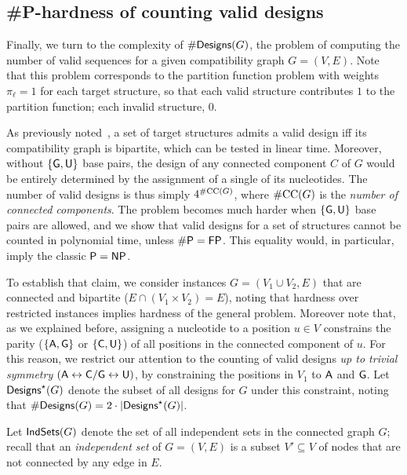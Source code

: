 \documentclass[twocolumn]{bmcart}%
\newcommand{\real}{\mathbb{R}}
\newcommand{\Def}[1]{\emph{#1}}
\newcommand{\Design}[1]{{\sf Designs}^{\star}(#1)}
\newcommand{\NumDesign}{\ensuremath{\#}{\sf Designs}\xspace}
\newcommand{\IS}[1]{{\sf IndSets}(#1)}
\newcommand{\Nuc}[1]{{\sf #1}}
\newcommand{\Ab}{\Nuc{A}}
\newcommand{\Cb}{\Nuc{C}}
\newcommand{\Gb}{\Nuc{G}}
\newcommand{\Ub}{\Nuc{U}}
\newcommand{\citep}[1]{\cite{#1}}
\begin{document}
\subsection*{\#{\sf P}-hardness of counting valid designs}\label{sec:counting}
Finally, we turn to the complexity of $\NumDesign(G)$, the problem of
computing the number of valid sequences for a given compatibility
graph $G=(V,E)$. Note that this problem corresponds to the partition
function problem with weights $\pi_\ell=1$ for each target structure, so that each valid structure contributes $1$ to the partition
function; each invalid structure, 0.

As previously noted~\citep{Flamm2001}, a set of target
structures admits a valid design iff its compatibility graph is
bipartite, which can be tested in linear time.  Moreover, without
$\{\Gb, \Ub\}$ base pairs, the design of any connected component $C$
of $G$ would be entirely determined by the assignment of a single of
its nucleotides. The number of valid designs is thus simply
$4^{\#{\rm CC}(G)}$, where $\#{\rm CC}(G)$ is the \Def{number of
  connected components}.
The problem becomes much harder when $\{\Gb, \Ub\}$ base pairs are allowed, and we show that valid designs for a set of structures cannot be counted in polynomial time, unless ${\sf\# P}={\sf FP}$. This equality would, in particular, imply the classic ${\sf P}={\sf NP}$.

To establish that claim, we consider instances $G=(V_1\cup V_2, E)$ that are connected and bipartite ($E \cap (V_1\times V_2) = E$), noting that hardness over restricted instances implies hardness of the general problem. Moreover note that, as we explained before, assigning a nucleotide to a position $u\in V$ constrains the parity ($\{\Ab,\Gb\}$ or $\{\Cb,\Ub\}$) of all positions in the connected component of $u$. For this reason, we restrict our attention to the counting of valid designs \emph{up to trivial  symmetry} $(\Ab\leftrightarrow \Cb/\Gb\leftrightarrow \Ub)$, by constraining the positions in $V_{1}$ to $\Ab$ and $\Gb$. Let $\Design{G}$ denote the subset of all designs for $G$ under this constraint, noting that $\NumDesign(G) = 2\cdot|\Design{G}|$.

Let $\IS{G}$ denote the set of all independent sets in the connected graph $G$; recall that an \Def{independent set} of $G=(V,E)$ is a subset $V'\subseteq V$ of nodes that are not connected by any edge in $E$. 
\end{document}
